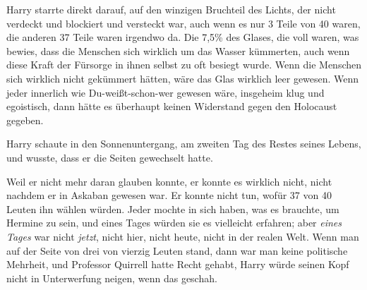 Harry starrte direkt darauf, auf den winzigen Bruchteil des Lichts, der nicht verdeckt und blockiert und versteckt war, auch wenn es nur 3 Teile von 40 waren, die anderen 37 Teile waren irgendwo da. Die 7,5\% des Glases, die voll waren, was bewies, dass die Menschen sich wirklich um das Wasser kümmerten, auch wenn diese Kraft der Fürsorge in ihnen selbst zu oft besiegt wurde. Wenn die Menschen sich wirklich nicht gekümmert hätten, wäre das Glas wirklich leer gewesen. Wenn jeder innerlich wie Du-weißt-schon-wer gewesen wäre, insgeheim klug und egoistisch, dann hätte es überhaupt keinen Widerstand gegen den Holocaust gegeben.

Harry schaute in den Sonnenuntergang, am zweiten Tag des Restes seines Lebens, und wusste, dass er die Seiten gewechselt hatte.

Weil er nicht mehr daran glauben konnte, er konnte es wirklich nicht, nicht nachdem er in Askaban gewesen war. Er konnte nicht tun, wofür 37 von 40 Leuten ihn wählen würden. Jeder mochte in sich haben, was es brauchte, um Hermine zu sein, und eines Tages würden sie es vielleicht erfahren; aber \emph{eines Tages} war nicht \emph{jetzt}, nicht hier, nicht heute, nicht in der realen Welt. Wenn man auf der Seite von drei von vierzig Leuten stand, dann war man keine politische Mehrheit, und Professor Quirrell hatte Recht gehabt, Harry würde seinen Kopf nicht in Unterwerfung neigen, wenn das geschah.

